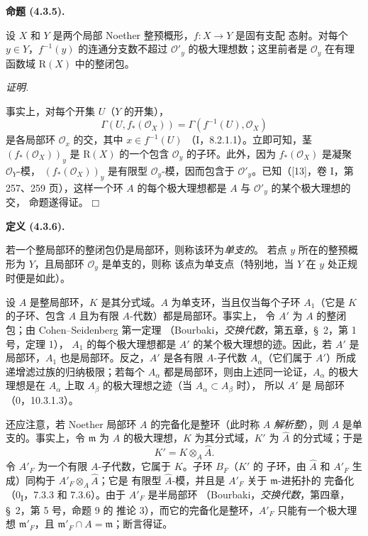 \documentclass[UTF8,fontset=none,11pt,oneside,openany]{ctexbook}
\providecommand{\square}{\mdlgwhtsquare}
\newenvironment{definition}[1][]{%
  \par\medskip\noindent\textbf{定义 (#1).}\ %
}{\par}
\newenvironment{proposition}[1][]{%
  \par\medskip\noindent\textbf{命题 (#1).}\ %
}{\par}
\newenvironment{proof}{%
  \par\smallskip\noindent\textit{证明.}\ %
}{\hfill$\square$\par}
\newcommand{\oldpage}[2][]{%
  \hypertarget{ega-source-page-#1-#2}{}%
  \marginnote{\scriptsize\textbf{#1}~|~#2}\ignorespaces}
\let\EGAOriginalLabel\label
\renewcommand{\label}[1]{\phantomsection\EGAOriginalLabel{#1}}
\begin{document}
\begin{proposition}[4.3.5]
\label{III.4.3.5-fr}
设 $X$ 和 $Y$ 是两个局部 Noether 整预概形，$f:X\to Y$ 是固有支配
态射。对每个 $y\in Y$，$f^{-1}(y)$ 的连通分支数不超过
$\mathcal O'_y$ 的极大理想数；这里前者是
$\mathcal O_y$ 在有理函数域 $\mathrm R(X)$ 中的整闭包。
\end{proposition}

\begin{proof}
事实上，对每个开集 $U$（$Y$ 的开集），
\[
\Gamma(U,f_*(\mathcal O_X))=\Gamma(f^{-1}(U),\mathcal O_X)
\]
是各局部环 $\mathcal O_x$ 的交，其中 $x\in f^{-1}(U)$
（I，8.2.1.1）。立即可知，茎 $(f_*(\mathcal O_X))_y$ 是
$\mathrm R(X)$ 的一个包含 $\mathcal O_y$ 的子环。此外，因为
$f_*(\mathcal O_X)$ 是凝聚 $\mathcal O_Y$-模，
$(f_*(\mathcal O_X))_y$ 是有限型 $\mathcal O_y$-模，因而包含于
$\mathcal O'_y$。已知（[13]，卷 I，第 257、259 页），这样一个环
$A$ 的每个极大理想都是 $A$ 与 $\mathcal O'_y$ 的某个极大理想的交，
命题遂得证。
\end{proof}

\begin{definition}[4.3.6]
\label{III.4.3.6-fr}
若一个整局部环的整闭包仍是局部环，则称该环为\emph{单支的}。
若点 $y$ 所在的整预概形为 $Y$，且局部环 $\mathcal O_y$ 是单支的，则称
该点为单支点（特别地，当 $Y$ 在 $y$ 处正规时便是如此）。
\end{definition}

设 $A$ 是整局部环，$K$ 是其分式域。$A$ 为单支环，当且仅当每个子环
$A_1$（它是 $K$ 的子环、包含 $A$ 且为有限 $A$-代数）都是局部环。事实上，
令 $A'$ 为 $A$ 的整闭包；由 Cohen--Seidenberg 第一定理
（Bourbaki，\emph{交换代数}，第五章，\S~2，第 1 号，定理 1），
$A_1$ 的每个极大理想都是 $A'$ 的某个极大理想的迹。因此，若 $A'$
是局部环，$A_1$ 也是局部环。反之，$A'$ 是各有限 $A$-子代数
$A_\alpha$（它们属于 $A'$）所成递增滤过族的归纳极限；若每个
$A_\alpha$ 都是局部环，则由上述同一论证，$A_\alpha$ 的极大理想是在
$A_\alpha$ 上取 $A_\beta$ 的极大理想之迹（当 $A_\alpha\subset A_\beta$ 时），
所以 $A'$ 是
局部环（0，10.3.1.3）。

\oldpage[III]{133}

还应注意，若 Noether 局部环 $A$ 的完备化是整环（此时称 $A$
\emph{解析整}），则 $A$ 是单支的。事实上，令 $\mathfrak m$ 为 $A$
的极大理想，$K$ 为其分式域，$K'$ 为 $\widehat A$ 的分式域；于是
\[
K'=K\otimes_A\widehat A.
\]
令 $A'_F$ 为一个有限 $A$-子代数，它属于 $K$。子环 $B_F$（$K'$ 的
子环，由 $\widehat A$ 和 $A'_F$ 生成）同构于
$A'_F\otimes_A\widehat A$；它是
有限型 $\widehat A$-模，并且是 $A'_F$ 关于 $\mathfrak m$-进拓扑的
完备化（0\textsubscript{I}，7.3.3 和 7.3.6）。由于 $A'_F$ 是半局部环
（Bourbaki，\emph{交换代数}，第四章，\S~2，第 5 号，命题 9 的
推论 3），而它的完备化是整环，$A'_F$ 只能有一个极大理想
$\mathfrak m'_F$，且 $\mathfrak m'_F\cap A=\mathfrak m$；断言得证。
\end{document}
